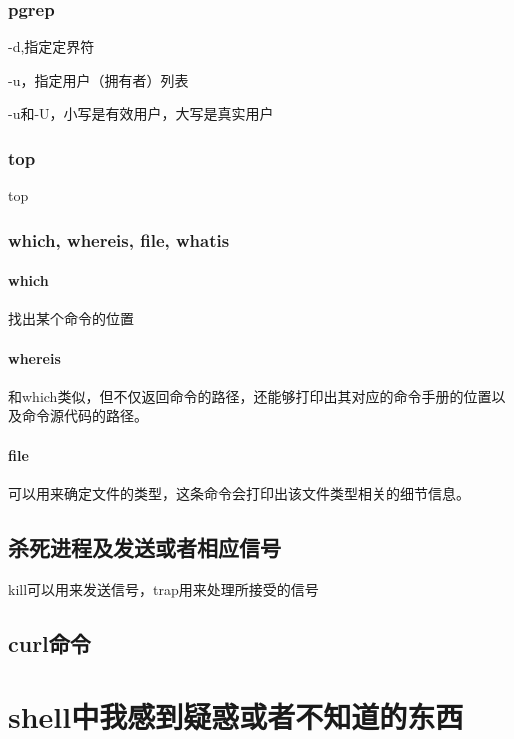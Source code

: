 \subsubsection{pgrep}

-d,指定定界符

-u，指定用户（拥有者）列表

-u和-U，小写是有效用户，大写是真实用户




\subsubsection{top}

top

\subsubsection{which, whereis, file, whatis}

\paragraph{which} 找出某个命令的位置

\paragraph{whereis} 和which类似，但不仅返回命令的路径，还能够打印出其对应的命令手册的位置以及命令源代码的路径。

\paragraph{file} 可以用来确定文件的类型，这条命令会打印出该文件类型相关的细节信息。



\subsection{杀死进程及发送或者相应信号}

kill可以用来发送信号，trap用来处理所接受的信号


\subsection{curl命令}


\section{shell中我感到疑惑或者不知道的东西}


